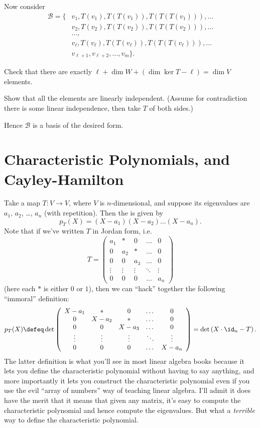 Now consider
\begin{align*}
	\mathcal B =
	\Big\{ & v_1, T(v_1), T(T(v_1)), T(T(T(v_1))), \dots \\
	& v_2, T(v_2), T(T(v_2)), T(T(T(v_2))), \dots \\
	& \dots, \\
	& v_\ell, T(v_\ell), T(T(v_\ell)), T(T(T(v_\ell))), \dots \\
	& v_{\ell+1}, v_{\ell+2}, \dots, v_m \Big\}.
\end{align*}
\begin{ques}
Check that there are exactly $\ell + \dim W + (\dim \ker T - \ell) = \dim V$ elements.
\end{ques}
\begin{exercise}
	Show that all the elements are linearly independent.
	(Assume for contradiction there is some linear independence,
	then take $T$ of both sides.)
\end{exercise}
Hence $\mathcal B$ is a basis of the desired form.


\section{Characteristic Polynomials, and Cayley-Hamilton}
Take a map $T : V \to V$, where $V$ is $n$-dimensional, and suppose its eigenvalues
are $a_1$, $a_2$, \dots, $a_n$ (with repetition).
Then the  is given by
\[
	p_T(X) = (X-a_1)(X-a_2) \dots (X-a_n).
\]
Note that if we've written $T$ in Jordan form, i.e.\ 
\[
	T
	=
	\left(
	\begin{array}{ccccc}
		a_1 & \ast & 0 & \dots & 0 \\
		0 & a_2 & \ast & \dots & 0 \\
		0 & 0 & a_3 & \dots & 0 \\
		\vdots & \vdots & \vdots & \ddots & \vdots \\
		0 & 0 & 0 & \dots & a_n
	\end{array}
	\right)
\]
(here each $\ast$ is either $0$ or $1$),
then we can ``hack'' together the following ``immoral'' definition:
\[
	p_T(X)
	\defeq
	\det
	\left(
	\begin{array}{ccccc}
		X - a_1 & \ast & 0 & \dots & 0 \\
		0 & X - a_2 & \ast & \dots & 0 \\
		0 & 0 & X - a_3 & \dots & 0 \\
		\vdots & \vdots & \vdots & \ddots & \vdots \\
		0 & 0 & 0 & \dots & X - a_n
	\end{array}
	\right)
	= \det \left( X \cdot \id_n - T \right).
\]
The latter definition is what you'll see in most linear algebra books because
it lets you define the characteristic polynomial without having to say anything,
and more importantly it lets you construct the characteristic polynomial
even if you use the evil ``array of numbers'' way of teaching linear algebra.
I'll admit it does have the merit that it means that given any matrix,
it's easy to compute the characteristic polynomial and hence
compute the eigenvalues.
But what a \emph{terrible} way to define the characteristic polynomial.

